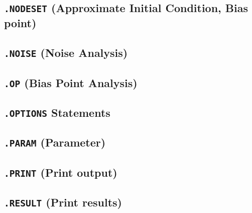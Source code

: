 \subsection{\texttt{.NODESET} (Approximate Initial Condition, Bias point)}


\newpage
\subsection{\texttt{.NOISE} (Noise Analysis) }
 



\newpage
\subsection{\texttt{.OP} (Bias Point Analysis)}


\newpage
\subsection{\texttt{.OPTIONS} Statements}


\newpage
\subsection{\texttt{.PARAM} (Parameter)}





\newpage
\subsection{\texttt{.PRINT} (Print output)}\label{.PRINT}


\newpage
\subsection{\texttt{.RESULT} (Print results)}\label{.RESULT}


